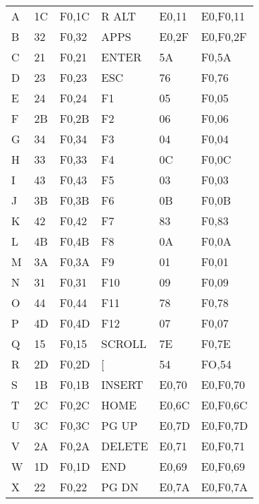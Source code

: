 \begin{center}
  \begin{tabular}{ | l | l | l | l | l | l | }
    \hline
	    \kword{KEY} & \kword{MAKE} & \kword{BREAK} & \kword{KEY} & \kword{MAKE} & \kword{BREAK} \\ \hline
	    A & 1C & F0,1C & R ALT & E0,11 & E0,F0,11  \\ \hline
	    B & 32 & F0,32 & APPS  & E0,2F & E0,F0,2F  \\ \hline
	    C & 21 & F0,21 & ENTER & 5A & F0,5A        \\ \hline
	    D & 23 & F0,23 & ESC   & 76 & F0,76        \\ \hline
	    E & 24 & F0,24 & F1 & 05 & F0,05           \\ \hline
	    F & 2B & F0,2B & F2 & 06 & F0,06           \\ \hline
	    G & 34 & F0,34 & F3 & 04 & F0,04           \\ \hline
	    H & 33 & F0,33 & F4 & 0C & F0,0C           \\ \hline	    
	    I & 43 & F0,43 & F5 & 03 & F0,03           \\ \hline
	    J & 3B & F0,3B & F6 & 0B & F0,0B           \\ \hline
	    K & 42 & F0,42 & F7 & 83 & F0,83           \\ \hline
	    L & 4B & F0,4B & F8 & 0A & F0,0A           \\ \hline
	    M & 3A & F0,3A & F9 & 01 & F0,01           \\ \hline
	    N & 31 & F0,31 & F10 & 09 & F0,09          \\ \hline
	    O & 44 & F0,44 & F11 & 78 & F0,78          \\ \hline
	    P & 4D & F0,4D & F12 & 07 & F0,07          \\ \hline
	    Q & 15 & F0,15 & SCROLL & 7E & F0,7E       \\ \hline
	    R & 2D & F0,2D & [ & 54 & FO,54            \\ \hline
	    S & 1B & F0,1B & INSERT & E0,70 & E0,F0,70 \\ \hline
	    T & 2C & F0,2C & HOME & E0,6C & E0,F0,6C   \\ \hline
	    U & 3C & F0,3C & PG UP & E0,7D & E0,F0,7D  \\ \hline
	    V & 2A & F0,2A & DELETE & E0,71 & E0,F0,71 \\ \hline
	    W & 1D & F0,1D & END & E0,69 & E0,F0,69    \\ \hline
	    X & 22 & F0,22 & PG DN & E0,7A & E0,F0,7A  \\ \hline

\end{tabular}
\end{center}
